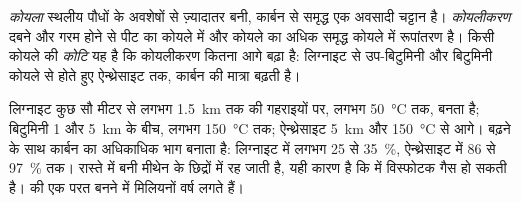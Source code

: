 \begin{definition}[कोयला; कोयलीकरण; कोटि]\label{def:g11:fossil-fuel-geology:coal}
\emph{कोयला} स्थलीय पौधों के अवशेषों से ज़्यादातर बनी, कार्बन से
समृद्ध एक अवसादी चट्टान है। \emph{कोयलीकरण} दबने और
गरम होने से पीट का कोयले में और कोयले का अधिक समृद्ध कोयले में
रूपांतरण है। किसी कोयले की \emph{कोटि} यह है कि
कोयलीकरण कितना आगे बढ़ा है: लिग्नाइट से उप-बिटुमिनी और बिटुमिनी
कोयले से होते हुए ऐन्थ्रेसाइट तक, कार्बन की मात्रा बढ़ती है।
\end{definition}

लिग्नाइट कुछ सौ मीटर से लगभग \qty{1.5}{km} तक की गहराइयों पर,
लगभग \qty{50}{\degreeCelsius} तक, बनता है; बिटुमिनी  1 और
\qty{5}{km} के बीच, लगभग \qty{150}{\degreeCelsius} तक; ऐन्थ्रेसाइट
\qty{5}{km} और \qty{150}{\degreeCelsius} से आगे।  बढ़ने के साथ कार्बन
 का अधिकाधिक भाग बनाता है: लिग्नाइट में लगभग
25 से \qty{35}{\percent}, ऐन्थ्रेसाइट में 86 से \qty{97}{\percent} तक। रास्ते में बनी मीथेन
 के छिद्रों में रह जाती है, यही कारण है कि  में
विस्फोटक गैस हो सकती है।  की एक परत बनने में मिलियनों
वर्ष लगते हैं।

